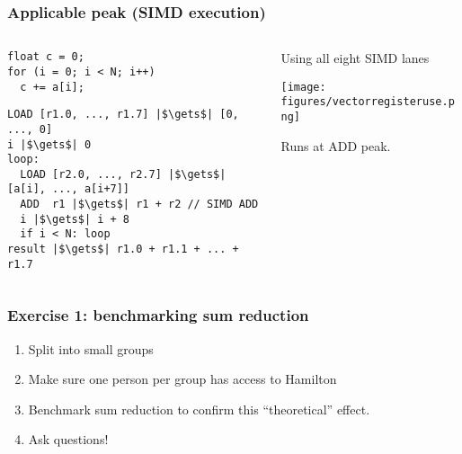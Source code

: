 \documentclass[dvipsnames,presentation,aspectratio=169,14pt]{beamer}
\begin{document}
\begin{frame}[fragile]
  \frametitle{Applicable peak (SIMD execution)}
  \begin{columns}
    \begin{column}{0.6\textwidth}\small

\begin{verbatim}
float c = 0;
for (i = 0; i < N; i++)
  c += a[i];
\end{verbatim}


\begin{verbatim}
LOAD [r1.0, ..., r1.7] |$\gets$| [0, ..., 0]
i |$\gets$| 0
loop:
  LOAD [r2.0, ..., r2.7] |$\gets$| [a[i], ..., a[i+7]]
  ADD  r1 |$\gets$| r1 + r2 // SIMD ADD
  i |$\gets$| i + 8
  if i < N: loop
result |$\gets$| r1.0 + r1.1 + ... + r1.7
\end{verbatim}

    \end{column}
    \begin{column}{0.3\textwidth}
      Using all eight SIMD lanes

      \begin{center}
        \texttt{[image: figures/vectorregisteruse.png]}
      \end{center}

      Runs at ADD peak.
    \end{column}
  \end{columns}
\end{frame}

\begin{frame}
  \frametitle{Exercise 1: benchmarking sum reduction}
  \begin{enumerate}[itemsep=8pt]
    \item Split into small groups
    \item Make sure one person per group has access to Hamilton
    \item Benchmark sum reduction to confirm this ``theoretical'' effect.
    \item Ask questions!
  \end{enumerate}
\end{frame}
\end{document}
